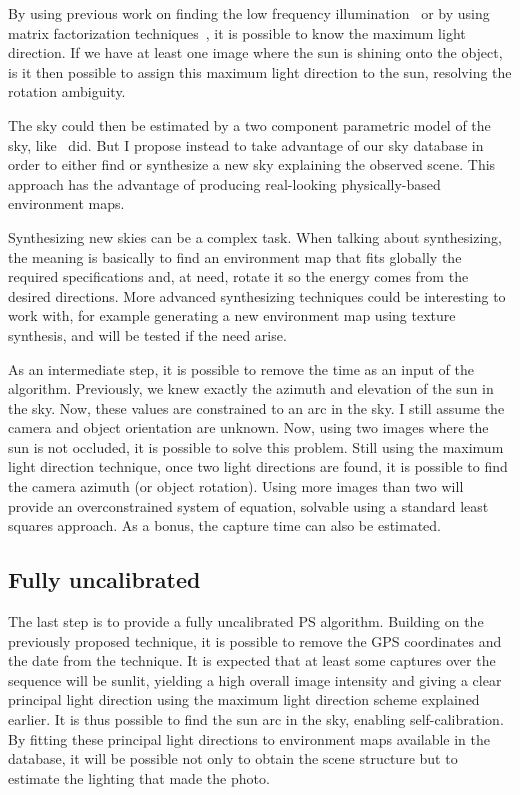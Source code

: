 By using previous work on finding the low frequency illumination~\cite{basri-ijcv-2007} or by using matrix factorization techniques~\cite{shi-cvpr-10}, it is possible to know the maximum light direction. If we have at least one image where the sun is shining onto the object, is it then possible to assign this maximum light direction to the sun, resolving the rotation ambiguity.

The sky could then be estimated by a two component parametric model of the sky, like~\cite{jung-cvpr-15} did. But I propose instead to take advantage of our sky database in order to either find or synthesize a new sky explaining the observed scene. This approach has the advantage of producing real-looking physically-based environment maps.

Synthesizing new skies can be a complex task. When talking about synthesizing, the meaning is basically to find an environment map that fits globally the required specifications and, at need, rotate it so the energy comes from the desired directions. More advanced synthesizing techniques could be interesting to work with, for example generating a new environment map using texture synthesis, and will be tested if the need arise.

As an intermediate step, it is possible to remove the time as an input of the algorithm. Previously, we knew exactly the azimuth and elevation of the sun in the sky. Now, these values are constrained to an arc in the sky. I still assume the camera and object orientation are unknown. Now, using two images where the sun is not occluded, it is possible to solve this problem. Still using the maximum light direction technique, once two light directions are found, it is possible to find the camera azimuth (or object rotation). Using more images than two will provide an overconstrained system of equation, solvable using a standard least squares approach. As a bonus, the capture time can also be estimated.


\subsection{Fully uncalibrated}
The last step is to provide a fully uncalibrated PS algorithm. Building on the previously proposed technique, it is possible to remove the GPS coordinates and the date from the technique. It is expected that at least some captures over the sequence will be sunlit, yielding a high overall image intensity and giving a clear principal light direction using the maximum light direction scheme explained earlier. It is thus possible to find the sun arc in the sky, enabling self-calibration. By fitting these principal light directions to environment maps available in the database, it will be possible not only to obtain the scene structure but to estimate the lighting that made the photo.

